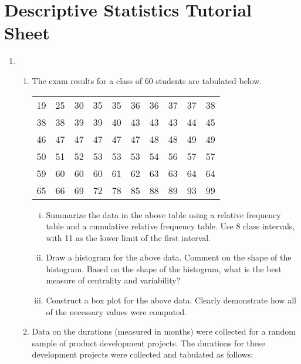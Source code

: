 \documentclass[a4paper,12pt]{article}
\begin{document}
\section*{Descriptive Statistics Tutorial Sheet}
\begin{enumerate}
	\item
\begin{enumerate}
\item The exam results for a class of 60 students are tabulated below.
\begin{table}[ht]
	\centering
	\begin{tabular}{|rrrrrrrrrr|}
		\hline
		
		19 &  25 &  30 &  35 &  35 &  36 &  36 &  37 &  37 &  38 \\ 
		38 &  38 &  39 &  39 &  40 &  43 &  43 &  43 &  44 &  45 \\ 
		46 &  47 &  47 &  47 &  47 &  47 &  48 &  48 &  49 &  49 \\ 
		50 &  51 &  52 &  53 &  53 &  53 &  54 &  56 &  57 &  57 \\ 
		59 &  60 &  60 &  60 &  61 &  62 &  63 &  63 &  64 &  64 \\ 
		65 &  66 &  69 &  72 &  78 &  85 &  88 &  89 &  93 &  99 \\ 
		\hline
	\end{tabular}
\end{table}

\begin{enumerate}[(i)]
	\item  Summarize the data in the above table using a relative frequency table and a cumulative relative frequency table. Use 8 class intervals, with 11 as the lower limit of the first interval.
	\item  Draw a histogram for the above data. Comment on the shape of the histogram. Based on the shape of the histogram, what is the best measure of centrality and variability?
	\item  Construct a box plot for the above data. Clearly demonstrate how all of the necessary values were computed.
\end{enumerate}


\item Data on the durations (measured in months) were collected for a random sample of product development projects.
The durations for these development projects were collected and tabulated as follows:

\begin{table}[ht]
	\centering
	\begin{tabular}{|rrrrrrrr|}
		\hline
		

\end{tabular}
\end{table}
\end{enumerate}
\end{enumerate}
\end{document}
